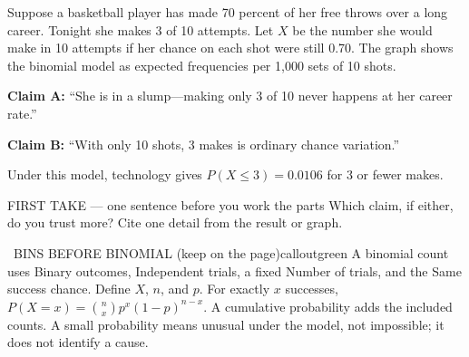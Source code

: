 \documentclass[11pt]{article}
\begin{document}


Suppose a basketball player has made 70 percent of her free throws over a long career. Tonight she makes 3 of 10 attempts. Let $X$ be the number she would make in 10 attempts if her chance on each shot were still 0.70. The graph shows the binomial model as expected frequencies per 1,000 sets of 10 shots.\par\smallskip \textbf{Claim A:} ``She is in a slump---making only 3 of 10 never happens at her career rate.''\par \textbf{Claim B:} ``With only 10 shots, 3 makes is ordinary chance variation.''\par Under this model, technology gives $P(X\leq3)=0.0106$ for 3 or fewer makes.\par
\begin{center}
\end{center}
\begin{firsttakebox}{FIRST TAKE --- one sentence before you work the parts}
Which claim, if either, do you trust more? Cite one detail from the result or graph.
\workspace{0.9in}
\end{firsttakebox}

\begin{callout}{\IconBook\ BINS BEFORE BINOMIAL (keep on the page)}{calloutgreen}
A binomial count uses Binary outcomes, Independent trials, a fixed Number of trials, and the Same success chance. Define $X$, $n$, and $p$. For exactly $x$ successes, $P(X=x)=\binom{n}{x}p^x(1-p)^{n-x}$. A cumulative probability adds the included counts. A small probability means unusual under the model, not impossible; it does not identify a cause.
\end{callout}
\end{document}
